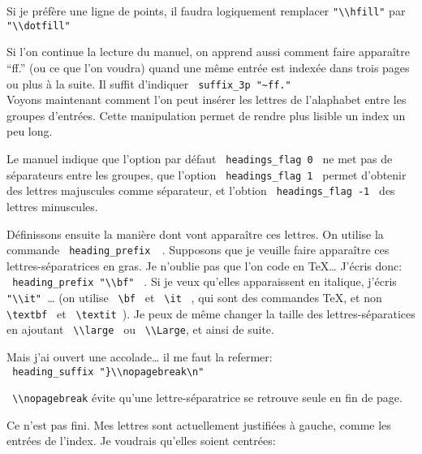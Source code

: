 Si je préfère une ligne de points, il faudra logiquement remplacer \verb|"\\hfill"| par \verb+ "\\dotfill" +


Si l'on continue la lecture du manuel, on apprend aussi comment faire apparaître \enquote{ff.} (ou ce que l'on voudra) quand une même entrée est indexée dans trois pages ou plus à la suite. Il suffit d'indiquer \verb+ suffix_3p "~ff." +
\\

Voyons maintenant comment l'on peut insérer les lettres de l'alaphabet entre les groupes d'entrées. Cette manipulation permet de rendre plus lisible un index un peu long. 

Le manuel indique que l'option par défaut \verb+ headings_flag 0 + ne met pas de séparateurs entre les groupes, que l'option \verb+ headings_flag 1 + permet d'obtenir des lettres majuscules comme séparateur, et l'obtion  \verb+ headings_flag -1 + des lettres minuscules.

Définissons ensuite la manière dont vont apparaître ces lettres. On utilise la commande \verb| heading_prefix  |. Supposons que je veuille faire apparaître ces lettres-séparatrices en gras. Je n'oublie pas que l'on code en \TeX … J'écris donc:\\
\verb| heading_prefix "\\bf" | . Si je veux qu'elles apparaissent en italique, j'écris \verb| "\\it" |… (on utilise \verb+ \bf + et \verb+ \it + , qui sont des commandes \TeX, et non \verb+ \textbf + et \verb+ \textit +).
Je peux de même changer la taille des lettres-séparatices en ajoutant \verb| \\large | ou \verb| \\Large|, et ainsi de suite. 

Mais j'ai ouvert une accolade… il me faut la refermer:\\
\verb| heading_suffix "}\\nopagebreak\n" | 

\verb| \\nopagebreak| évite qu'une lettre-séparatrice se retrouve seule en fin de page. 


Ce n'est pas fini. Mes lettres sont actuellement justifiées à gauche, comme les entrées de l'index. Je voudrais qu'elles soient centrées: \\

